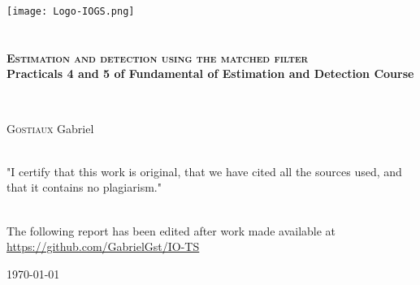 \begin{titlepage}
\begin{center}

\texttt{[image: Logo-IOGS.png]}~\\[1.5cm]


\textsc{\Large }\\[0.5cm]

\HRule \\[0.4cm]

{\bfseries
\huge \textsc{Estimation and detection using the matched filter}\\[0.5cm]
\Large Practicals 4 and 5 of Fundamental of Estimation and Detection Course}

\HRule \\[1cm]

\begin{minipage}{0.8\textwidth}
\begin{flushleft} \large
\textsc{Gostiaux} Gabriel \\[1cm]
\end{flushleft}
\end{minipage}


\textsc{\Large }\\[1cm]
"I certify that this work is original, that we have cited all the sources used, and that it contains no plagiarism."

\textsc{\Large }\\[1cm]
The following report has been edited after work made available at \href{Uhttps://github.com/GabrielGst/IO-TSRL}{https://github.com/GabrielGst/IO-TS}




\vfill

{\large \today}

\end{center}
\end{titlepage}